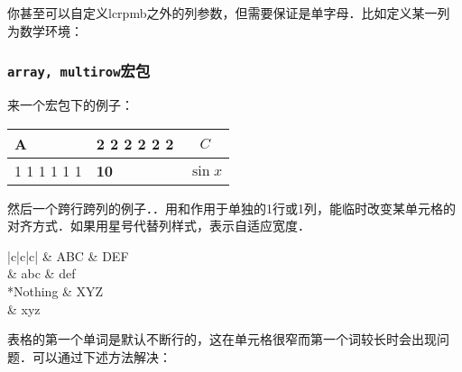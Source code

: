 你甚至可以自定义lcrpmb之外的列参数，但需要保证是单字母．比如定义某一列为数学环境：
\begin{latex}
\end{latex}

\subsubsection{\texttt{array, multirow}宏包}
来一个宏包下的例子：
\begin{codeshow}
\begin{tabular}{|>{\setlength
  \parindent{5mm}}m{1cm}|
  >{\large\bfseries}m{1.5cm}|
  >{$}c<{$}|}
  \hline A & 2 2 2 2 2 2 & C\\
  \hline 1 1 1 1 1 1  & 10 & \sin x \\ \hline
\end{tabular}
\end{codeshow}

然后一个跨行跨列的例子．．用和作用于单独的1行或1列，能临时改变某单元格的对齐方式．如果用星号代替列样式，表示自适应宽度．

\begin{codeshow}
\begin{center}
\begin{tabular}{|c|c|c|}
  \hline
    & ABC & DEF \\
   & abc & def \\
  \hline
    {*{Nothing}} & XYZ \\
   & xyz \\
  \hline
\end{tabular}
\end{center}
\end{codeshow}

表格的第一个单词是默认不断行的，这在单元格很窄而第一个词较长时会出现问题．可以通过下述方法解决：


